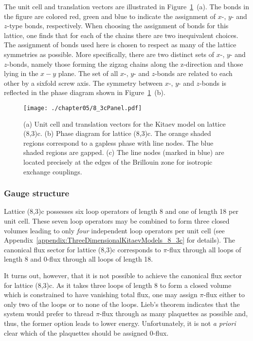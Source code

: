 The unit cell and translation vectors are illustrated in Figure~\ref{fig:chapter05_8_3cPanel}~(a).
The bonds in the figure are colored red, green and blue to indicate the assignment of $x$-, $y$- and $z$-type bonds, respectively.
When choosing the assignment of bonds for this lattice, one finds that for each of the chains there are two inequivalent choices.
The assignment of bonds used here is chosen to respect as many of the lattice symmetries as possible. 
More specifically, there are two distinct sets of $x$-, $y$- and $z$-bonds, namely those forming the zigzag chains along the z-direction and those lying in the $x-y$ plane.
The set of all $x$-, $y$- and $z$-bonds are related to each other by a sixfold screw axis.
The symmetry between $x$-, $y$- and $z$-bonds is reflected in the phase diagram shown in Figure~\ref{fig:chapter05_8_3cPanel}~(b).
%
\begin{figure}[tb]
	\centering
	\texttt{[image: ./chapter05/8\_3cPanel.pdf]}
	\caption{
		(a) Unit cell and translation vectors for the Kitaev model on lattice (8,3)c.
		(b) Phase diagram for lattice (8,3)c.
		The orange shaded regions correspond to a gapless phase with line nodes.
		The blue shaded regions are gapped.
		(c) The line nodes (marked in blue) are located precisely at the edges of the Brillouin zone for isotropic exchange couplings.
	}
	\label{fig:chapter05_8_3cPanel}
\end{figure}
%


%
%
\subsubsection{Gauge structure}
%
%
Lattice (8,3)c possesses six loop operators of length 8 and one of length 18 per unit cell.
These seven loop operators may be combined to form three closed volumes leading to only \textit{four} independent loop operators per unit cell (see Appendix~\ref{appendix:ThreeDimensionalKitaevModels_8_3c} for details).
The canonical flux sector for lattice (8,3)c corresponds to $\pi$-flux through all loops of length 8 and $0$-flux through all loops of length 18.

It turns out, however, that it is not possible to achieve the canonical flux sector for lattice (8,3)c.
As it takes three loops of length 8 to form a closed volume which is constrained to have vanishing total flux, one may assign $\pi$-flux either to only two of the loops or to none of the loops.
Lieb's theorem indicates that the system would prefer to thread $\pi$-flux through as many plaquettes as possible and, thus, the former option leads to lower energy.
Unfortunately, it is not \textit{a priori} clear which of the plaquettes should be assigned $0$-flux.

